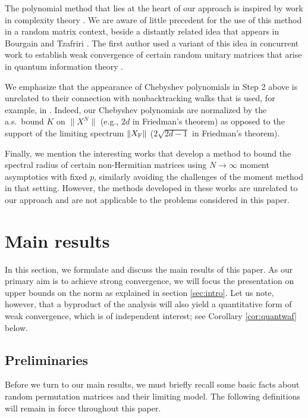 \documentclass[10pt,reqno]{amsart}
\theoremstyle{definition}
\theoremstyle{remark}
\numberwithin{equation}{section}
\numberwithin{figure}{section}
\numberwithin{table}{section}
\begin{document}
The polynomial method that lies at the heart of our approach is inspired 
by work in complexity theory \cite{Aar08}. We are aware of little 
precedent for the use of this method in a random matrix context, beside a 
distantly related idea that appears in Bourgain and Tzafriri \cite[Theorem 
2.3]{BT91}. The first author used a variant of this idea in concurrent 
work to establish weak convergence of certain random unitary matrices that 
arise in quantum information theory \cite{Che24a,Che24b}.

We emphasize that the appearance of Chebyshev polynomials in Step 2 above 
is unrelated to their connection with nonbacktracking walks that is used, 
for example, in \cite[Lemma 2.3]{Fri08}. Indeed, our Chebyshev polynomials 
are normalized by the a.s.\ bound $K$ on $\|X^N\|$ (e.g., $2d$ in 
Friedman's theorem) as opposed to the support of the limiting spectrum 
$\|X_{\rm F}\|$ ($2\sqrt{2d-1}$ in Friedman's theorem).

Finally, we mention the interesting works \cite{BCG22,CLZ24} that develop 
a method to bound the spectral radius of certain non-Hermitian matrices
using $N\to\infty$ moment asymptotics with fixed $p$, similarly avoiding 
the challenges of the moment method in that setting. However, the methods
developed in these works are unrelated to our approach and are not 
applicable to the problems considered in this paper.


\section{Main results}
\label{sec:main}

In this section, we formulate and discuss the main results of this paper. 
As our primary aim is to achieve strong convergence, we will focus the 
presentation on upper bounds on the norm as explained in section 
\ref{sec:intro}. Let us note, however, that a byproduct of the analysis 
will also yield a quantitative form of weak convergence, which is of 
independent interest; see Corollary \ref{cor:quantwaf} below.


\subsection{Preliminaries}
\label{sec:prelim}

Before we turn to our main results, we must briefly recall some basic 
facts about random permutation matrices and their limiting model.
The following definitions will remain in force throughout this paper.
\end{document}
